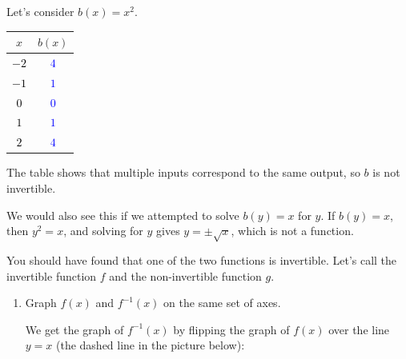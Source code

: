 \documentclass{article}
\begin{document}
\begin{enumerate}
\begin{enumerate}
\begin{solution}
        Let's consider $b(x)=x^2$.
        \begin{center}
          \begin{tabular} {c|c} 
            $x$ & $b(x)$ \\ \hline
            \textcolor{black}{$-2$ }&\textcolor{blue}{$4$} \\
            \textcolor{black}{$-1$ }&\textcolor{blue}{$1$} \\
            \textcolor{black}{$0$ }&\textcolor{blue}{$0$} \\
            \textcolor{black}{$1$ }&\textcolor{blue}{$1$} \\
            \textcolor{black}{$2$ }&\textcolor{blue}{$4$}\\ 
          \end{tabular}
        \end{center} 
        The table shows that multiple inputs correspond to the same
        output, so $b$ is not invertible.

        We would also see this if we attempted to solve $b(y)=x$ for $y$.
        If $b(y)=x$, then $y^2=x$, and solving for $y$ gives $y=\pm\sqrt{x}$, which
        is not a function.
    \end{solution} 

  \end{enumerate}

  \pspace{\newpage}

  You should have found that one of the two functions is invertible. Let's call the invertible function $f$ and the non-invertible function $g$. 

  \begin{enumerate}[resume]
  \item
    \begin{problem}[\vfill]
      Graph $f(x)$ and $f^{-1}(x)$ on the same set of axes.
    \end{problem}

    \begin{solution}
      We get the graph of $f^{-1}(x)$ by flipping the graph of $f(x)$
      over the line $y = x$ (the dashed line in the picture below):
      \begin{center}
      \end{center} 
    \end{solution} 


\end{enumerate}
\end{enumerate}
\end{document}
